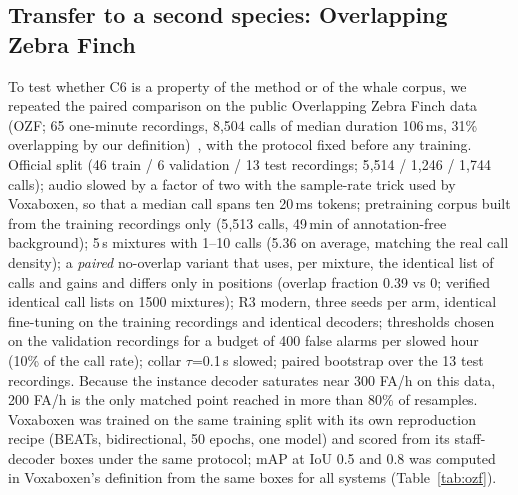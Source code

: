 \documentclass[10pt,twocolumn]{article}
\begin{document}
\subsection{Transfer to a second species: Overlapping Zebra Finch}
\label{sec:ozf}
To test whether C6 is a property of the method or of the whale corpus, we repeated the paired comparison on the public Overlapping Zebra Finch data (OZF; 65 one-minute recordings, 8{,}504 calls of median duration 106\,ms, 31\% overlapping by our definition)~\citep{mahon2025voxaboxen}, with the protocol fixed before any training. Official split (46 train / 6 validation / 13 test recordings; 5{,}514 / 1{,}246 / 1{,}744 calls); audio slowed by a factor of two with the sample-rate trick used by Voxaboxen, so that a median call spans ten 20\,ms tokens; pretraining corpus built from the training recordings only (5{,}513 calls, 49\,min of annotation-free background); 5\,s mixtures with 1--10 calls (5.36 on average, matching the real call density); a \emph{paired} no-overlap variant that uses, per mixture, the identical list of calls and gains and differs only in positions (overlap fraction 0.39 vs 0; verified identical call lists on 1500 mixtures); R3 modern, three seeds per arm, identical fine-tuning on the training recordings and identical decoders; thresholds chosen on the validation recordings for a budget of 400 false alarms per slowed hour (10\% of the call rate); collar $\tau$=0.1\,s slowed; paired bootstrap over the 13 test recordings. Because the instance decoder saturates near 300 FA/h on this data, 200 FA/h is the only matched point reached in more than 80\% of resamples. Voxaboxen was trained on the same training split with its own reproduction recipe (BEATs, bidirectional, 50 epochs, one model) and scored from its staff-decoder boxes under the same protocol; mAP at IoU 0.5 and 0.8 was computed in Voxaboxen's definition from the same boxes for all systems (Table~\ref{tab:ozf}).
\end{document}
